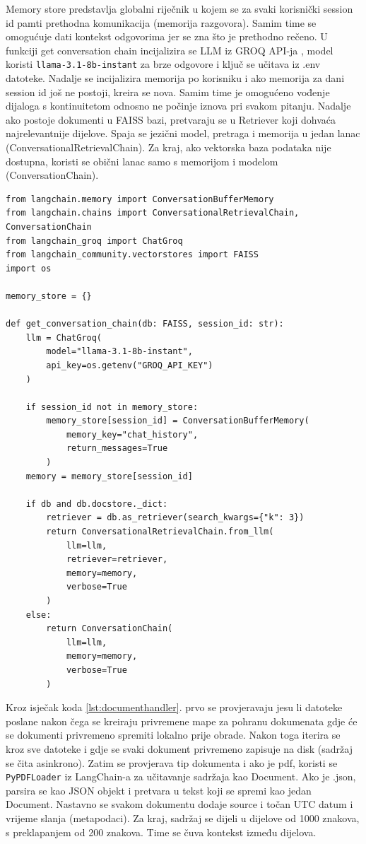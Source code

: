 \documentclass[]{foi}
\begin{document}
Memory store predstavlja globalni riječnik u kojem se za svaki korisnički session id pamti prethodna komunikacija (memorija razgovora). Samim
time se omogućuje dati kontekst odgovorima jer se zna što je prethodno rečeno. U funkciji get conversation chain incijalizira se LLM iz GROQ API-ja
, model koristi \verb|llama-3.1-8b-instant| za brze odgovore i ključ se učitava iz .env datoteke. Nadalje se incijalizira memorija po korisniku i ako
memorija za dani session id još ne postoji, kreira se nova. Samim time je omogućeno vođenje dijaloga s kontinuitetom odnosno ne počinje iznova
pri svakom pitanju. Nadalje ako postoje dokumenti u FAISS bazi, pretvaraju se u Retriever koji dohvaća najrelevantnije dijelove.
Spaja se jezični model, pretraga i memorija u jedan lanac (ConversationalRetrievalChain). Za kraj, ako vektorska baza podataka nije dostupna,
koristi se obični lanac samo s memorijom i modelom (ConversationChain).
\begin{longlisting}
\begin{verbatim}
from langchain.memory import ConversationBufferMemory
from langchain.chains import ConversationalRetrievalChain, ConversationChain
from langchain_groq import ChatGroq
from langchain_community.vectorstores import FAISS
import os

memory_store = {}

def get_conversation_chain(db: FAISS, session_id: str):
    llm = ChatGroq(
        model="llama-3.1-8b-instant", 
        api_key=os.getenv("GROQ_API_KEY")
    )

    if session_id not in memory_store:
        memory_store[session_id] = ConversationBufferMemory(
            memory_key="chat_history",
            return_messages=True
        )
    memory = memory_store[session_id]

    if db and db.docstore._dict:
        retriever = db.as_retriever(search_kwargs={"k": 3})
        return ConversationalRetrievalChain.from_llm(
            llm=llm,
            retriever=retriever,
            memory=memory,
            verbose=True
        )
    else:
        return ConversationChain(
            llm=llm,
            memory=memory,
            verbose=True
        )
\end{verbatim}
\caption{qa.py}
\label{lst:qa}
\end{longlisting}

Kroz isječak koda \ref{lst:documenthandler}. prvo se provjeravaju jesu li datoteke poslane nakon čega se kreiraju privremene mape za pohranu dokumenata gdje će se dokumenti privremeno
spremiti lokalno prije obrade. Nakon toga iterira se kroz sve datoteke i gdje se svaki dokument privremeno zapisuje na disk (sadržaj se čita asinkrono).
Zatim se provjerava tip dokumenta i ako je pdf, koristi se \verb|PyPDFLoader| iz LangChain-a za učitavanje sadržaja kao Document. Ako je .json, parsira se
kao JSON objekt i pretvara u tekst koji se spremi kao jedan Document. Nastavno se svakom dokumentu dodaje source i točan UTC datum i vrijeme slanja (metapodaci).
Za kraj, sadržaj se dijeli u dijelove od 1000 znakova, s preklapanjem od 200 znakova. Time se čuva kontekst između dijelova.
\end{document}
